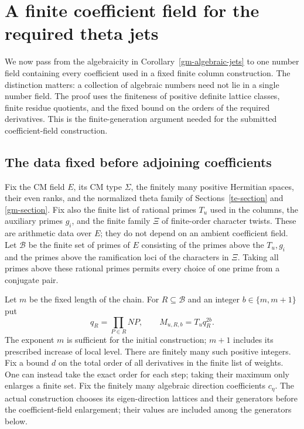 \section{A finite coefficient field for the required theta jets}
\label{jcf-section}

We now pass from the algebraicity in Corollary~\ref{gm-algebraic-jets}
to one number field containing every coefficient used in a fixed
finite column construction. The distinction matters: a collection
of algebraic numbers need not lie in a single number field.
The proof uses the finiteness of positive definite lattice classes,
finite residue quotients, and the fixed bound on the orders of the
required derivatives. This is the finite-generation argument needed
for the submitted coefficient-field construction.\cite{alpo-uniform-source}

\subsection{The data fixed before adjoining coefficients}

Fix the CM field $E$, its CM type $\Sigma$, the finitely many
positive Hermitian spaces, their even ranks, and the normalized
theta family of Sections~\ref{te-section} and \ref{gm-section}.
Fix also the finite list of rational primes $T_u$ used in the
columns, the auxiliary primes $g_i$, and the finite family
$\Xi$ of finite-order character twists. These are arithmetic
data over $E$; they do not depend on an ambient coefficient
field. Let $\mathcal B$ be the finite set of primes of $E$
consisting of the primes above the $T_u,g_i$ and the primes
above the ramification loci of the characters in $\Xi$.
Taking all primes above these rational primes permits every
choice of one prime from a conjugate pair.

Let $m$ be the fixed length of the chain. For $R\subseteq
\mathcal B$ and an integer $b\in\{m,m+1\}$ put
\[
 q_R=\prod_{P\in R}NP,\qquad
                   M_{u,R,b}=T_uq_R^{2b}.                 \tag{JF1}
\]
The exponent $m$ is sufficient for the initial construction;
$m+1$ includes its prescribed increase of local level.
There are finitely many such positive integers. Fix a bound
$d$ on the total order of all derivatives in the finite
list of weights. One can instead take the exact order for
each step; taking their maximum only enlarges a finite set.
Fix the finitely many algebraic direction coefficients
$c_\eta$. The actual construction chooses its eigen-direction
lattices and their generators before the coefficient-field
enlargement; their values are included among the generators
below.

